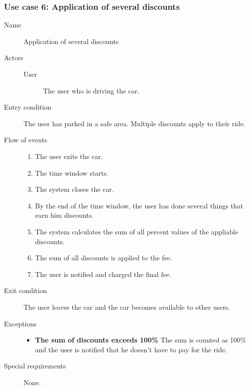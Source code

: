 	\subsubsection{Use case 6: Application of several discounts}
		\begin{description}
			\item[Name] Application of several discounts
			\item[Actors] \hfill
				\begin{description}
					\item[User] The user who is driving the car.
				\end{description}
			\item[Entry condition] The user has parked in a safe area. Multiple discounts apply to their ride.
			\item[Flow of events]
				\begin{enumerate}
					\item The user exits the car.
					\item The time window starts.
					\item The system closes the car.
					\item By the end of the time window, the user has done several things that earn him discounts.
					\item The system calculates the sum of all percent values of the appliable discounts.
					\item The sum of all discounts is applied to the fee.
					\item The user is notified and charged the final fee. 
				\end{enumerate}
			\item[Exit condition] The user leaves the car and the car becomes available to other users.
			\item[Exceptions]
				\begin{itemize}
					\item \textbf{The sum of discounts exceeds 100\%} The sum is counted as 100\% and the user is notified that he doesn't have to pay for the ride. 
				\end{itemize}
			\item[Special requirements] None.
		\end{description}
	
